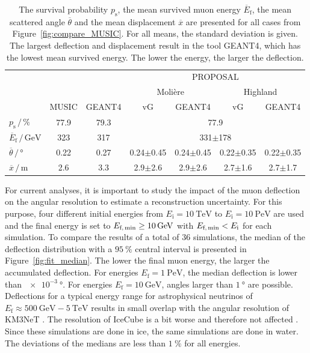 \begin{table}
    \small
    \centering
    \caption{The survival probability $p_{\text{s}}$, the mean survived muon 
    energy $\overline{E}_{\text{f}}$, the mean scattered angle $\overline{\theta}$ 
    and the mean displacement $\overline{x}$ are presented for all cases from 
    Figure~\ref{fig:compare_MUSIC}. For all means, the standard deviation is given.
    The largest deflection and displacement result in the tool GEANT4, which has the lowest mean survived energy. The lower the energy, the larger the deflection.}
    \begin{tabular}{l|cc|cccc}
        \toprule
        & & & \multicolumn{4}{c}{PROPOSAL} \\
        &  & & \multicolumn{2}{c}{Molière} & \multicolumn{2}{c}{Highland} \\
        & MUSIC & GEANT4 & vG & GEANT4 & vG & GEANT4 \\
        \midrule
        $p_{\text{s}}\,/\,\si{\percent}$ & 77.9 & 79.3 &  \multicolumn{4}{c}{77.9}\\
        $\overline{E}_{\text{f}}\,/\,\si{\giga\electronvolt}$ & 323 & 317 & \multicolumn{4}{c}{331$\pm$178} \\
        $\overline{\theta}\,/\,\si{\degree}$ & 0.22 & 0.27 & 0.24$\pm$0.45 & 0.24$\pm$0.45 & 0.22$\pm$0.35 & 0.22$\pm$0.35   \\
        $\overline{x}\,/\,\si{\meter}$ & 2.6 & 3.3 & 2.9$\pm$2.6 & 2.9$\pm$2.6 & 2.7$\pm$1.6 & 2.7$\pm$1.7  \\
     \bottomrule
    \end{tabular}
    \label{tab:compare_MUSIC}
\end{table}




For current analyses, it is important to study the impact of the muon 
deflection on the angular resolution to estimate a reconstruction uncertainty.
For this purpose, four different initial energies 
from $E_{\text{i}} = \SI{10}{\tera\electronvolt}$ to 
$E_{\text{i}} = \SI{10}{\peta\electronvolt}$ are used and the final 
energy is set to $E_{\text{f,\,min}} \geq \SI{10}{\giga\electronvolt}$ with 
$E_{\text{f,\,min}} < E_{\text{i}}$ for each simulation. To compare the results of 
a total of $\num{36}$ simulations, the median of the deflection distribution 
with a $\SI{95}{\percent}$ central interval is presented in 
Figure~\ref{fig:fit_median}.
The lower the final muon energy, the larger the accumulated deflection. 
For energies $E_{\text{f}} = \SI{1}{\peta\electronvolt}$, the median deflection 
is lower than $\SI{e-3}{\degree}$. For energies $E_{\text{f}} = \SI{10}{\giga\electronvolt}$, 
angles larger than $\SI{1}{\degree}$ are possible. Deflections for a typical energy range 
for astrophysical neutrinos of $E_{\text{f}} \approx \SI{500}{\giga\electronvolt} - \SI{5}{\tera\electronvolt}$
\cite{jan?} results in small overlap with the angular resolution of KM3NeT 
\cite{KM3NeT_Resolution2016}. The resolution of IceCube is a bit worse and 
therefore not affected \cite{IceCube_Resolution2021}. Since these simulations are done 
in ice, the same simulations are done in water. The deviations of the medians
are less than $\SI{1}{\percent}$ for all energies.


